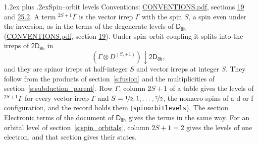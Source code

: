 \documentclass[10pt,a4paper]{article}
\makeatletter
\renewcommand\section{\@startsection{section}{1}{\z@}{-3ex plus -1ex minus -.2ex}%
  {1.2ex plus .2ex}{\normalfont\large\sffamily\bfseries\color{parttitle}}}
\numberwithin{equation}{section}
\newcommand{\grp}[1]{\mathsf{#1}}
\newcommand{\restr}[2]{#1\!\downarrow#2}
\newcommand{\irrJp}[2]{D^{(#1,#2)}}
\newcommand{\irrprod}{\otimes}
\newcommand{\term}[2]{{}^{#1}#2}
\makeatother
\begin{document}
\section{Spin--orbit levels}\label{s:spin_orbit}
Conventions: \href{../../CONVENTIONS.pdf}{CONVENTIONS.pdf}, sections \href{../../../rotation/CONVENTIONS.pdf\#conv.19}{19} and \href{../../CONVENTIONS.pdf\#conv.25.2}{25.2}.
\leavevmode\label{n:local.spin}\label{n:symbol.term}A term $\term{2S+1}{\Gamma}$ is the vector irrep $\Gamma$ with the spin $S$, a spin even under the inversion, as in the terms of the degenerate levels of \href{../../../rotation/data/pdf/D8h.pdf}{$\grp{D_{8h}}$} (\href{../../CONVENTIONS.pdf}{CONVENTIONS.pdf}, section \href{../../../rotation/CONVENTIONS.pdf\#conv.19}{19}). Under spin--orbit coupling it splits into the irreps of $\grp{2D_{8h}}$ in
\begin{equation}\label{e:spinorbit}\restr{(\Gamma \irrprod \irrJp{S}{+1})}{\grp{2D_{8h}}},\end{equation}
and they are spinor irreps at half-integer $S$ and vector irreps at integer $S$. They follow from the products of section~\ref{s:fusion} and the multiplicities of section~\ref{s:subduction_parent}. Row $\Gamma$, column $2S + 1$ of a table gives the levels of $\term{2S+1}{\Gamma}$ for every vector irrep $\Gamma$ and $S = \nicefrac{1}{2}, 1, \dots, \nicefrac{7}{2}$, the nonzero spins of a d or f configuration, and the record holds them (\texttt{spinorbitlevels}). The section Electronic terms of the document of \href{../../../rotation/data/pdf/D8h.pdf}{$\grp{D_{8h}}$} gives the terms in the same way. For an orbital level of section~\ref{s:spin_orbitals}, column $2S + 1 = 2$ gives the levels of one electron, and that section gives their states.
\end{document}

